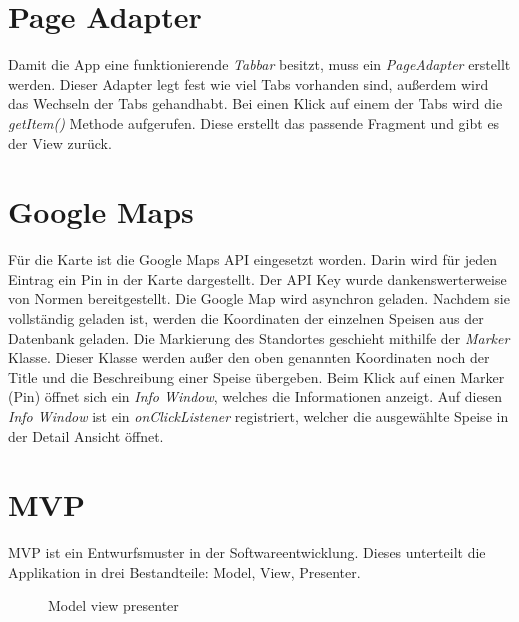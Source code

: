 \documentclass[
    DIV12,
    cleardouble=plain,
    headings=normal,
    pdftex,
    headexclude,footexclude,
    final
]{scrreprt}
\begin{document}
\newpage

\section{Page Adapter}
Damit die App eine funktionierende \textit{Tabbar} besitzt, muss ein \textit{PageAdapter} erstellt werden. Dieser Adapter legt fest wie viel Tabs vorhanden sind, außerdem wird das Wechseln der Tabs gehandhabt. Bei einen Klick auf einem der Tabs wird die \textit{getItem()} Methode aufgerufen. Diese erstellt das passende Fragment und gibt es der View zurück.\\




\section{Google Maps}
Für die Karte ist die Google Maps API eingesetzt worden. Darin wird für jeden Eintrag ein Pin in der Karte dargestellt.
Der API Key wurde dankenswerterweise von Normen bereitgestellt.
Die Google Map wird asynchron geladen. Nachdem sie vollständig geladen ist, werden die Koordinaten der einzelnen Speisen aus der Datenbank geladen. Die Markierung des Standortes geschieht mithilfe der \textit{Marker} Klasse. Dieser Klasse werden außer den oben genannten Koordinaten noch der Title und die Beschreibung einer Speise übergeben. Beim Klick auf einen Marker (Pin) öffnet sich ein 
\textit{Info Window}, welches die Informationen anzeigt. Auf diesen \textit{Info Window} ist ein \textit{onClickListener} registriert, welcher die ausgewählte Speise in der Detail Ansicht öffnet.


\newpage

\section{MVP}
MVP ist ein Entwurfsmuster in der Softwareentwicklung.  Dieses unterteilt die Applikation in drei Bestandteile: Model, View, Presenter.\\


\begin{figure}[H]
		\centering
		\caption{Model view presenter}
	\label{MVP}
\end{figure}
	
\end{document}

